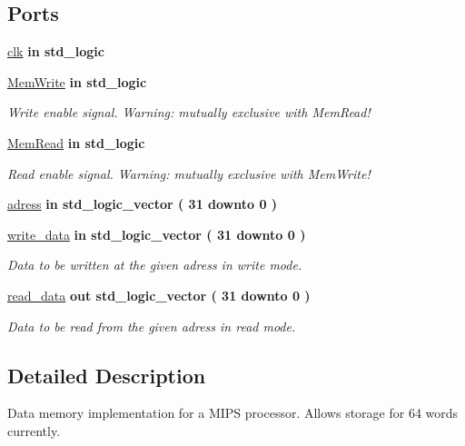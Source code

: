 \subsection*{\-Ports}
 \begin{DoxyCompactItemize}
\item 
\hyperlink{classdata__memory_a78bd51cc257fe0e8fa69227fc1865a8e}{clk}  {\bfseries {\bfseries in }} {\bfseries std\-\_\-logic } 
\item 
\hyperlink{classdata__memory_a20b873e427ea4a28cb74ec7d495730d8}{\-Mem\-Write}  {\bfseries {\bfseries in }} {\bfseries std\-\_\-logic } 
\begin{DoxyCompactList}\small\item\em \-Write enable signal. \-Warning\-: mutually exclusive with \-Mem\-Read! \end{DoxyCompactList}\item 
\hyperlink{classdata__memory_a24c8cc235a5d3a2ce36383b15a577f8e}{\-Mem\-Read}  {\bfseries {\bfseries in }} {\bfseries std\-\_\-logic } 
\begin{DoxyCompactList}\small\item\em \-Read enable signal. \-Warning\-: mutually exclusive with \-Mem\-Write! \end{DoxyCompactList}\item 
\hyperlink{classdata__memory_a2defa08e23fedc6207b33f767eada3aa}{adress}  {\bfseries {\bfseries in }} {\bfseries std\-\_\-logic\-\_\-vector (   31    downto    0  ) } 
\item 
\hyperlink{classdata__memory_a51f56919bb46d2865cf22fe28742660b}{write\-\_\-data}  {\bfseries {\bfseries in }} {\bfseries std\-\_\-logic\-\_\-vector (   31    downto    0  ) } 
\begin{DoxyCompactList}\small\item\em \-Data to be written at the given adress in write mode. \end{DoxyCompactList}\item 
\hyperlink{classdata__memory_a4cbcac52c2e90b6e7e111be703b6afdb}{read\-\_\-data}  {\bfseries {\bfseries out }} {\bfseries std\-\_\-logic\-\_\-vector (   31    downto    0  ) } 
\begin{DoxyCompactList}\small\item\em \-Data to be read from the given adress in read mode. \end{DoxyCompactList}\end{DoxyCompactItemize}


\subsection{\-Detailed \-Description}
\-Data memory implementation for a \-M\-I\-P\-S processor. \-Allows storage for 64 words currently. 

